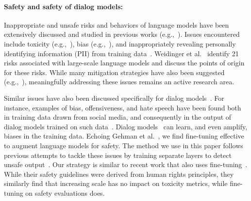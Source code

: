 \paragraph{Safety and safety of dialog models:} Inappropriate and unsafe risks and behaviors of language models have been extensively discussed and studied in previous works (e.g.,~\cite{dinan2021anticipating,weidinger2021ethical}). Issues encountered include toxicity (e.g.,~\cite{bulo2016dropout,mcguffie20,abid2021persistent}), bias (e.g.,~\cite{manwoman,basta-etal-2019-evaluating,kurita-etal-2019-measuring,hurtfulwords,sheng-etal-2019-woman,zhao-etal-2019-gender,guo2020detecting,prabhakaran2019perturbation,may2019measuring,sap-etal-2019-risk,bordia-bowman-2019-identifying,bender2021dangers,sap-etal-2020-social,hutchinson-etal-2020-social,abid2021large}), and inappropriately revealing personally identifying information (PII) from training data~\cite{carlini2020extracting}. Weidinger et al.~\cite{weidinger2021ethical} identify 21 risks associated with large-scale language models and discuss the points of origin for these risks. While many mitigation strategies have also been suggested (e.g.,~\cite{counterfactual,huang-etal-2020-reducing,jon20,qian-etal-2019-reducing,liang-etal-2020-towards,xu2020safetyrecipes,liu21,xu-etal-2021-bot,liang21}), meaningfully addressing these issues remains an active research area.

Similar issues have also been discussed specifically for dialog models~\cite{dinan2021anticipating}. For instance, examples of bias, offensiveness, and hate speech have been found both in training data drawn from social media, and consequently in the output of dialog models trained on such data~\cite{henderson2018ethical}. Dialog models~\cite{dinan-etal-2020-queens} can learn, and even amplify, biases in the training data. Echoing Gehman et al.~\cite{gehman-etal-2020-realtoxicityprompts}, we find fine-tuning effective to augment language models for safety. The method we use in this paper follows previous attempts to tackle these issues by training separate layers to detect unsafe output~\cite{adiwardana2020humanlike,liu2019does,blenderbot,xu2020safetyrecipes}. Our strategy is similar to recent work that also uses fine-tuning~\cite{solaiman2021palms}. While their safety guidelines were derived from human rights principles, they similarly find that increasing scale has no impact on toxicity metrics, while fine-tuning on safety evaluations does.

